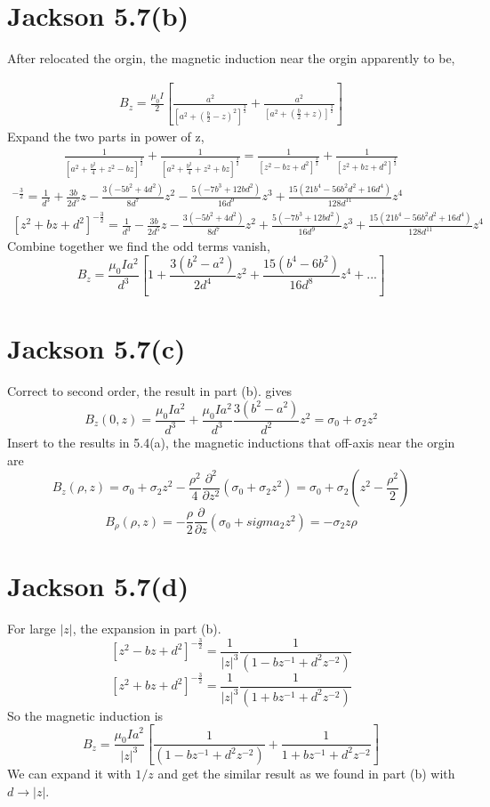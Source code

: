\documentclass{article}
\newcommand{\pd}[2]{\frac{\partial#1}{\partial#2}}
\begin{document}
\section*{Jackson 5.7(b)}

After relocated the orgin, the magnetic induction near the orgin apparently to be,

\begin{align*}
  B_z=\frac{\mu_0I}{2}[\frac{a^2}{[a^2+(\frac b2-z)^2]^{\frac 32}}+\frac{a^2}{[a^2+(\frac b2+z)]^{\frac 32}}]
\end{align*}
Expand the two parts in power of z,
\begin{align*}
  \frac{1}{[a^2+\frac{b^2}{4}+z^2-bz]^{\frac 32}}+\frac{1}{[a^2+\frac{b^2}{4}+z^2+bz]^{\frac 32}}=\frac{1}{[z^2-bz+d^2]^{\frac 32}}+\frac{1}{[z^2+bz+d^2]^{\frac 32}}
\end{align*}
\begin{align*}
  [z^2-bz+d^2]^{-\frac 32}=\frac{1}{d^3}+\frac{3b}{2d^5}z-\frac{3(-5b^2+4d^2)}{8d^7}z^2-\frac{5(-7b^3+12bd^2)}{16d^9}z^3+\frac{15(21b^4-56b^2d^2+16d^4)}{128d^{11}}z^4\\
  [z^2+bz+d^2]^{-\frac 32}=\frac{1}{d^3}-\frac{3b}{2d^5}z-\frac{3(-5b^2+4d^2)}{8d^7}z^2+\frac{5(-7b^3+12bd^2)}{16d^9}z^3+\frac{15(21b^4-56b^2d^2+16d^4)}{128d^{11}}z^4
\end{align*}
Combine together we find the odd terms vanish,
\[ \boxed{B_z=\frac{\mu_0Ia^2}{d^3}[1+\frac{3(b^2-a^2)}{2d^4}z^2+\frac{15(b^4-6b^2)}{16d^8}z^4+...]}\]

\section*{Jackson 5.7(c)}

Correct to second order, the result in part (b). gives
\[ B_z(0,z)=\frac{\mu_0Ia^2}{d^3}+\frac{\mu_0Ia^2}{d^3}\frac{3(b^2-a^2)}{d^2}z^2=\sigma_0+\sigma_2z^2 \]
Insert to the results in 5.4(a), the magnetic inductions that off-axis near the orgin are
\[ B_z(\rho,z)=\sigma_0+\sigma_2z^2-\frac{\rho^2}{4}\pd{^2}{z^2}(\sigma_0+\sigma_2z^2)=\sigma_0+\sigma_2(z^2-\frac{\rho^2}{2})\]
\[ B_\rho(\rho,z)=-\frac{\rho}{2}\pd{}{z}(\sigma_0+sigma_2z^2)=-\sigma_2z\rho\]
\section*{Jackson 5.7(d)}
For large $|z|$, the expansion in part (b).
\[ [z^2-bz+d^2]^{-\frac 32}=\frac{1}{|z|^3}\frac{1}{(1-bz^{-1}+d^2z^{-2})} \]
\[ [z^2+bz+d^2]^{-\frac 32}=\frac{1}{|z|^3}\frac{1}{(1+bz^{-1}+d^2z^{-2})} \]
So the magnetic induction is
\[ \boxed{B_z=\frac{\mu_0Ia^2}{|z|^3}[\frac{1}{(1-bz^{-1}+d^2z^{-2})}+\frac{1}{1+bz^{-1}+d^2z^{-2}}]}\]
We can expand it with $1/z$ and get the similar result as we found in part (b) with $d\rightarrow |z|$.
\end{document}
